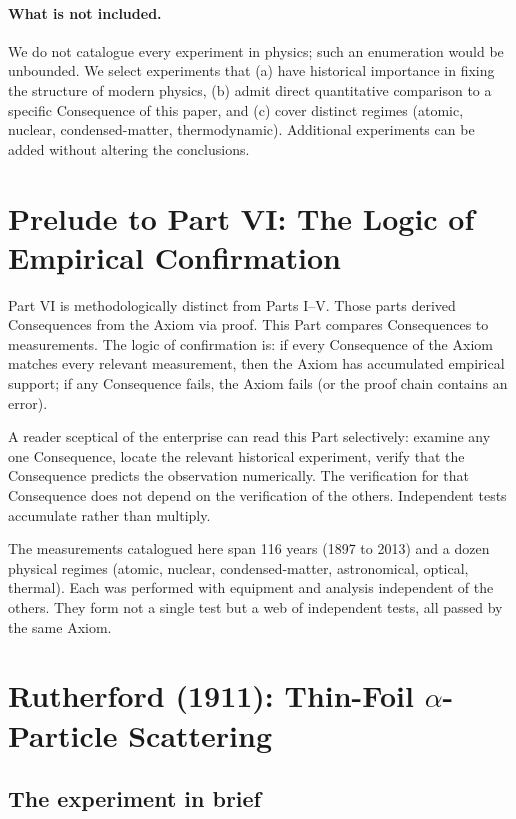 \documentclass[11pt,twocolumn,a4paper]{article}
\theoremstyle{axiomstyle}
\theoremstyle{conseqstyle}
\theoremstyle{definition}
\theoremstyle{remark}
\begin{document}
\paragraph{What is not included.} We do not catalogue every experiment in physics; such an enumeration would be unbounded. We select experiments that (a) have historical importance in fixing the structure of modern physics, (b) admit direct quantitative comparison to a specific Consequence of this paper, and (c) cover distinct regimes (atomic, nuclear, condensed-matter, thermodynamic). Additional experiments can be added without altering the conclusions.

\section*{Prelude to Part VI: The Logic of Empirical Confirmation}

Part VI is methodologically distinct from Parts I--V. Those parts derived Consequences from the Axiom via proof. This Part compares Consequences to measurements. The logic of confirmation is: if every Consequence of the Axiom matches every relevant measurement, then the Axiom has accumulated empirical support; if any Consequence fails, the Axiom fails (or the proof chain contains an error).

A reader sceptical of the enterprise can read this Part selectively: examine any one Consequence, locate the relevant historical experiment, verify that the Consequence predicts the observation numerically. The verification for that Consequence does not depend on the verification of the others. Independent tests accumulate rather than multiply.

The measurements catalogued here span 116 years (1897 to 2013) and a dozen physical regimes (atomic, nuclear, condensed-matter, astronomical, optical, thermal). Each was performed with equipment and analysis independent of the others. They form not a single test but a web of independent tests, all passed by the same Axiom.

\section{Rutherford (1911): Thin-Foil \texorpdfstring{$\alpha$}{alpha}-Particle Scattering}
\label{sec:rutherford}

\subsection{The experiment in brief}
\end{document}
